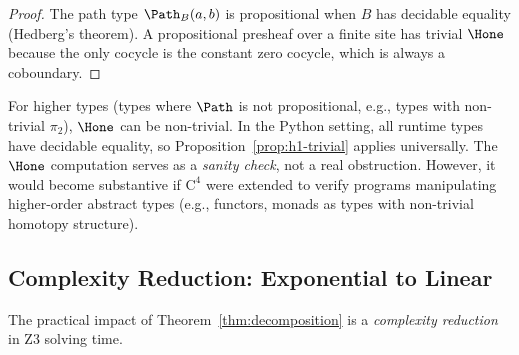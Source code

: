\begin{proof}
The path type $\Path_B(a, b)$ is propositional when $B$ has decidable
equality (Hedberg's theorem).  A propositional presheaf over a
finite site has trivial $\Hone$ because the only cocycle is the
constant zero cocycle, which is always a coboundary.
\end{proof}

\begin{remark}
For higher types (types where $\Path$ is not propositional, e.g.,
types with non-trivial $\pi_2$), $\Hone$ can be non-trivial.  In
the Python setting, all runtime types have decidable equality, so
Proposition~\ref{prop:h1-trivial} applies universally.  The $\Hone$
computation serves as a \emph{sanity check}, not a real obstruction.
However, it would become substantive if $\mathrm{C}^4$ were extended
to verify programs manipulating higher-order abstract types (e.g.,
functors, monads as types with non-trivial homotopy structure).
\end{remark}


\subsection{Complexity Reduction: Exponential to Linear}
\label{sec:complexity}

The practical impact of Theorem~\ref{thm:decomposition} is a
\emph{complexity reduction} in Z3 solving time.

